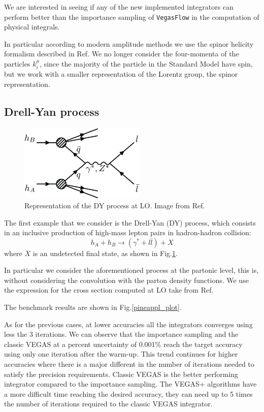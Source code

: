 \documentclass[../main/main.tex]{subfiles}
\begin{document}
We are interested in seeing if any of the new implemented integrators can perform better than the importance sampling of \texttt{VegasFlow} in the computation of physical integrals.

In particular according to modern amplitude methods we use the spinor helicity formalism described in Ref\cite{Dixon:1613349}. We no longer consider the four-momenta of the particles $k_i^\mu$, since the majority of the particle in the Standard Model have spin, but we work with a smaller representation of the Lorentz group, the spinor representation.
    
\subsection{Drell-Yan process}

\begin{figure}
	\centering
	\includegraphics[width=6cm]{../images/Drell-Yan-process-a-quark-of-one-hadron-and-an-antiquark-of-another-hadron-annihilate.png}
	\caption{Representation of the DY process at LO. Image from Ref\cite{article}.}
	\label{DY}
\end{figure}
The first example that we consider is the Drell-Yan (DY) process, which consists in an inclusive production of high-mass lepton pairs in hadron-hadron collision:
\begin{equation}
	h_A + h_B \rightarrow ( \gamma^* + l \bar{l}) + X 
\end{equation}
where $X$ is an undetected final state, as shown in Fig.\ref{DY}.

In particular we consider the aforementioned process at the partonic level, this is, without considering the convolution with the parton density functions. We use the expression for the cross section computed at LO take from Ref\cite{Carrazza_2020}.

The benchmark results are shown in Fig.\ref{pineappl_plot}. 

As for the previous cases, at lower accuracies all the integrators converges using less the 3 iterations. We can observe that the importance sampling and the classic VEGAS at a percent uncertainty of 0.001\% reach the target accuracy using only one iteration after the warm-up.
This trend continues for higher accuracies where there is a major different in the number of iterations needed to satisfy the precision requirements. Classic VEGAS is the better performing integrator compared to the importance sampling. The VEGAS+ algorithms have a more difficult time reaching the desired accuracy, they can need up to 5 times the number of iterations required to the classic VEGAS integrator.
\end{document}
